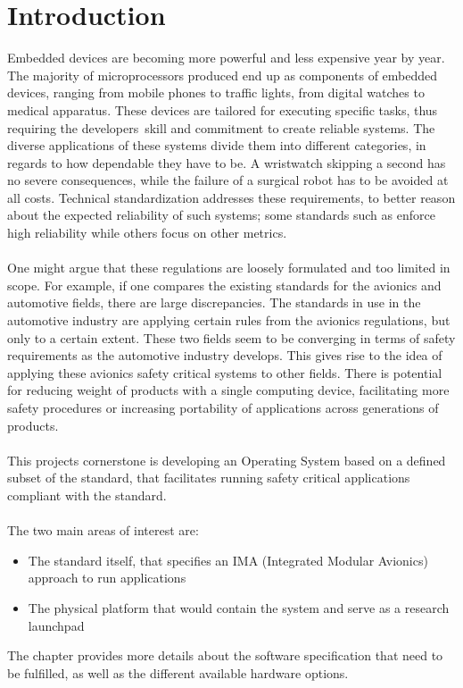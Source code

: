 \chapter{Introduction}\label{ch:introduction}

Embedded devices are becoming more powerful and less expensive year by year.
The majority of microprocessors produced end up as components of embedded devices,
ranging from mobile phones to traffic lights, from digital watches to medical apparatus.
These devices are tailored for executing specific tasks,
thus requiring the developers\textquotesingle\ skill and commitment to create reliable systems.
The diverse applications of these systems divide them into different categories,
in regards to how dependable they have to be. A wristwatch skipping a second has no severe consequences,
while the failure of a surgical robot has to be avoided at all costs.
Technical standardization addresses these requirements,
to better reason about the expected reliability of such systems;
some standards such as \arinc{}\cite{arinc_whole_standard} enforce high reliability while others focus on other metrics.
\\\\
One might argue that these regulations are loosely formulated and too limited in scope.
For example, if one compares the existing standards for the avionics and automotive fields,
there are large discrepancies.
The standards in use in the automotive industry are applying certain rules from the avionics regulations,
but only to a certain extent\cite{can_cars_fly}.
These two fields seem to be converging in terms of safety requirements as the automotive industry develops.
This gives rise to the idea of applying these avionics safety critical systems to other fields.
There is potential for reducing weight of products with a single 
computing device\cite{boeing_weight_reduction},
facilitating more safety procedures
or increasing portability of applications across generations of products.
\\\\
This project\textquotesingle s cornerstone is developing an Operating System based on a defined subset of the \arinc{} standard,
that facilitates running safety critical applications compliant with the \arinc{} standard.
\\\\
The two main areas of interest are:
\\
\begin{itemize}
\item The standard itself, that specifies an IMA 
(Integrated Modular Avionics) approach to run applications
\item The physical platform that would contain the system and serve as a research launchpad
\end{itemize}
The  chapter provides more details about the software specification that need to be fulfilled,
as well as the different available hardware options.
